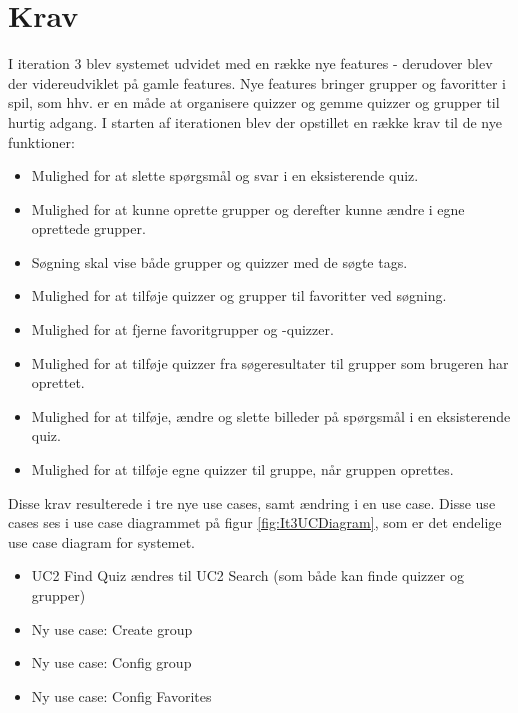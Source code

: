 \section{Krav}

I iteration 3 blev systemet udvidet med en række nye features - derudover blev der videreudviklet på gamle features. Nye features bringer grupper og favoritter i spil, som hhv. er en måde at organisere quizzer og gemme quizzer og grupper til hurtig adgang.
I starten af iterationen blev der opstillet en række krav til de nye funktioner:

\begin{itemize}
	\item Mulighed for at slette spørgsmål og svar i en eksisterende quiz.
	\item Mulighed for at kunne oprette grupper og derefter kunne ændre i egne oprettede grupper.
	\item Søgning skal vise både grupper og quizzer med de søgte tags.
	\item Mulighed for at tilføje quizzer og grupper til favoritter ved søgning.
	\item Mulighed for at fjerne favoritgrupper og -quizzer.
	\item Mulighed for at tilføje quizzer fra søgeresultater til grupper som brugeren har oprettet.
	\item Mulighed for at tilføje, ændre og slette billeder på spørgsmål i en eksisterende quiz.
	\item Mulighed for at tilføje egne quizzer til gruppe, når gruppen oprettes.
\end{itemize}

Disse krav resulterede i tre nye use cases, samt ændring i en use case. Disse use cases ses i use case diagrammet på figur \ref{fig:It3UCDiagram}, som er det endelige use case diagram for systemet.

\begin{itemize}
	\item UC2 Find Quiz ændres til UC2 Search (som både kan finde quizzer og grupper)
	\item Ny use case: Create group
	\item Ny use case: Config group
	\item Ny use case: Config Favorites
\end{itemize}

